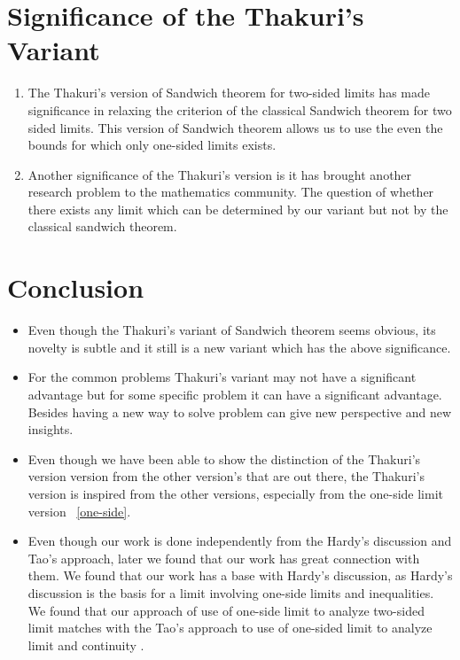 \documentclass[a4paper,twoside,12pt]{article}
\theoremstyle{plain}
\theoremstyle{definition}
\theoremstyle{theorem}
\begin{document}
{\section{Significance of the Thakuri's Variant}
\begin{enumerate}
\item The Thakuri's version of Sandwich theorem for two-sided limits has made significance in relaxing the criterion of the classical Sandwich theorem for two sided limits. This version of Sandwich theorem allows us to use the even the bounds for which only one-sided limits exists.

\item Another significance of the Thakuri's version is it has brought another research problem to the mathematics community. The question of whether there exists any limit which can be determined by our variant but not by the classical sandwich theorem.

\end{enumerate}

\section{Conclusion}
\begin{itemize}
\item Even though the Thakuri's variant of Sandwich theorem seems obvious, its novelty is subtle and it still is a new variant which has the above significance.

\item For the common problems Thakuri's variant may not have a significant advantage but for some specific problem it can have a significant advantage. Besides having a new way to solve problem can give new perspective and new insights.

\item Even though we have been able to show the distinction of the Thakuri's version version from the other version's that are out there, the Thakuri's version is inspired from the other versions, especially from the one-side limit version ~\ref{one-side}.

\item Even though our work is done independently from the Hardy's discussion and Tao's approach, later we found that our work has great connection with them. We found that our work has a base with Hardy's discussion, as Hardy's discussion is the basis for a limit involving one-side limits and inequalities. We found that our approach of use of one-side limit to analyze two-sided limit matches with the Tao's approach to use of one-sided limit to analyze limit and continuity \cite{tao}.
\end{itemize}

}
\end{document}
